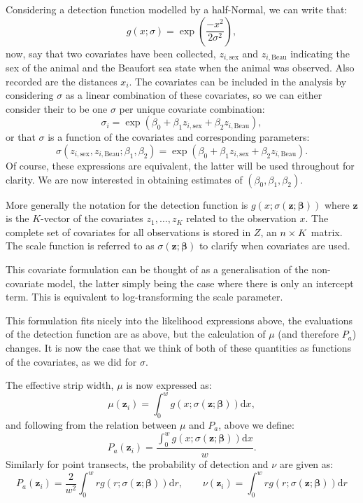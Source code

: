 Considering a detection function modelled by a half-Normal, we can write that:
\begin{equation}
g(x; \sigma) = \exp\left (\frac{-x^2}{2\sigma^2}\right ),
\end{equation}
now, say that two covariates have been collected, $z_{i,\text{sex}}$ and $z_{i,\text{Beau}}$ indicating the sex of the animal and the Beaufort sea state when the animal was observed. Also recorded are the distances $x_i$. The covariates can be included in the analysis by considering $\sigma$ as a linear combination of these covariates, so we can either consider their to be one $\sigma$ per unique covariate combination:
\begin{equation}
\sigma_i = \exp( \beta_0 + \beta_1 z_{i,\text{sex}} + \beta_2 z_{i,\text{Beau}}),
\end{equation}
or that $\sigma$ is a function of the covariates and corresponding parameters:
\begin{equation}
\sigma(z_{i,\text{sex}}, z_{i,\text{Beau}}; \beta_1, \beta_2) = \exp(\beta_0 + \beta_1 z_{i,\text{sex}} + \beta_2 z_{i,\text{Beau}}).
\end{equation}
Of course, these expressions are equivalent, the latter will be used throughout for clarity. We are now interested in obtaining estimates of $(\beta_0, \beta_1, \beta_2)$.

More generally the notation for the detection function is $g(x ; \sigma(\bm{z}; \bm{\beta}))$ where $\bm{z}$ is the $K$-vector of the covariates $z_1, \dots, z_K$ related to the observation $x$. The complete set of covariates for all observations is stored in $Z$, an $n \times K$ matrix. The scale function is referred to as $\sigma(\bm{z}; \bm{\beta})$ to clarify when covariates are used.

This covariate formulation can be thought of as a generalisation of the non-covariate model, the latter simply being the case where there is only an intercept term. This is equivalent to log-transforming the scale parameter.

This formulation fits nicely into the likelihood expressions above, the evaluations of the detection function are as above, but the calculation of $\mu$ (and therefore $P_a$) changes. It is now the case that we think of both of these quantities as functions of the covariates, as we did for $\sigma$.

The effective strip width, $\mu$ is now expressed as:
\begin{equation}
\mu(\bm{z}_i) = \int_0^w g(x ; \sigma(\bm{z}; \bm{\beta})) \text{d}x,
\end{equation}
and following from the relation between $\mu$ and $P_a$, above we define:
\begin{equation}
P_a(\bm{z}_i) = \frac{\int_0^w g(x ; \sigma(\bm{z}; \bm{\beta})) \text{d}x}{w}.
\end{equation}
Similarly for point transects, the probability of detection and $\nu$ are given as:
\begin{equation}
P_a(\bm{z}_i) =\frac{2}{w^2}\int_0^w r g(r; \sigma(\bm{z}; \bm{\beta})) \text{d}r, \qquad \nu(\bm{z}_i) = \int_0^w r g(r; \sigma(\bm{z}; \bm{\beta})) \text{d}r
\end{equation}

